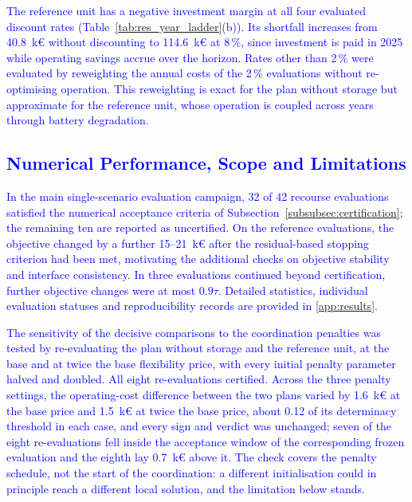 \documentclass[preprint,12pt]{elsarticle}
\begin{document}
\textcolor{blue}{
    The reference unit has a negative investment margin at all four evaluated discount rates (Table~\ref{tab:res_year_ladder}(b)). Its shortfall increases from 40.8~k\euro{} without discounting to 114.6~k\euro{} at 8\,\%, since investment is paid in 2025 while operating savings accrue over the horizon. Rates other than 2\,\% were evaluated by reweighting the annual costs of the 2\,\% evaluations without re-optimising operation. This reweighting is exact for the plan without storage but approximate for the reference unit, whose operation is coupled across years through battery degradation.
}


\subsection{\textcolor{blue}{Numerical Performance, Scope and Limitations}}
\label{subsec:res_certification}

\textcolor{blue}{
    In the main single-scenario evaluation campaign, 32 of 42 recourse evaluations satisfied the numerical acceptance criteria of Subsection~\ref{subsubsec:certification}; the remaining ten are reported as uncertified. On the reference evaluations, the objective changed by a further 15--21~k\euro{} after the residual-based stopping criterion had been met, motivating the additional checks on objective stability and interface consistency. In three evaluations continued beyond certification, further objective changes were at most $0.9\tau$. Detailed statistics, individual evaluation statuses and reproducibility records are provided in \ref{app:results}.
}

\textcolor{blue}{
    The sensitivity of the decisive comparisons to the coordination penalties was tested by re-evaluating the plan without storage and the reference unit, at the base and at twice the base flexibility price, with every initial penalty parameter halved and doubled. All eight re-evaluations certified. Across the three penalty settings, the operating-cost difference between the two plans varied by 1.6~k\euro{} at the base price and 1.5~k\euro{} at twice the base price, about 0.12 of its determinacy threshold in each case, and every sign and verdict was unchanged; seven of the eight re-evaluations fell inside the acceptance window of the corresponding frozen evaluation and the eighth lay 0.7~k\euro{} above it. The check covers the penalty schedule, not the start of the coordination: a different initialisation could in principle reach a different local solution, and the limitation below stands.
}
\end{document}

